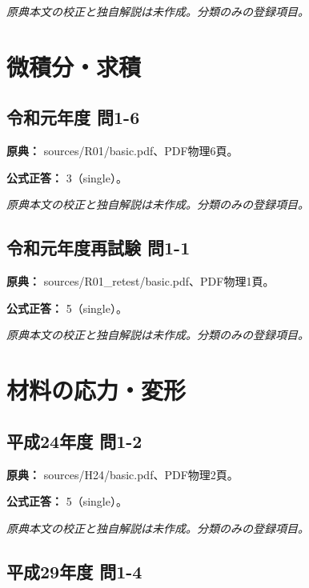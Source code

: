 \par\textit{原典本文の校正と独自解説は未作成。分類のみの登録項目。}

\section{微積分・求積}

\subsection{令和元年度 問1-6}
\label{q:r01-reg-basic-1-6}

\noindent\textbf{原典：} sources/R01/basic.pdf、PDF物理6頁。

\textbf{公式正答：} 3（single）。

\par\textit{原典本文の校正と独自解説は未作成。分類のみの登録項目。}

\subsection{令和元年度再試験 問1-1}
\label{q:r01-ret-basic-1-1}

\noindent\textbf{原典：} sources/R01\_retest/basic.pdf、PDF物理1頁。

\textbf{公式正答：} 5（single）。

\par\textit{原典本文の校正と独自解説は未作成。分類のみの登録項目。}

\section{材料の応力・変形}

\subsection{平成24年度 問1-2}
\label{q:h24-reg-basic-1-2}

\noindent\textbf{原典：} sources/H24/basic.pdf、PDF物理2頁。

\textbf{公式正答：} 5（single）。

\par\textit{原典本文の校正と独自解説は未作成。分類のみの登録項目。}

\subsection{平成29年度 問1-4}
\label{q:h29-reg-basic-1-4}

